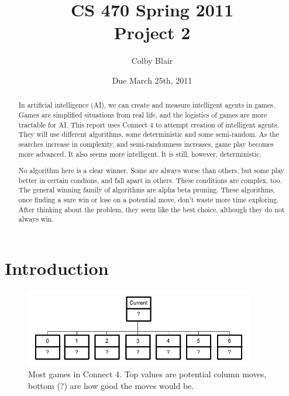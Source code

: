 \documentclass[12pt]{article}
\title{CS 470 Spring 2011 \\
     Project 2}
\author{Colby Blair}
\date{Due March 25th, 2011}
\begin{document}
\maketitle

\begin{abstract}
In artificial intelligence (AI), we can create and measure intelligent agents in
games. Games are simplified situations from real life, and the logistics of 
games are more tractable for AI. This report uses Connect 4 to attempt creation
of intelligent agents. They will use different algorithms, some deterministic 
and some semi-random. As the searches increase in complexity, and 
semi-randomness increases, game play becomes more advanced. It also seems
more intelligent. It is still, however, deterministic.

No algorithm here is a clear winner. Some are always worse than others, but some play better in certain 
condions, and fall apart in others. These conditions are complex, too. The general winning family of 
algorithms are alpha beta pruning. These algorithms, once finding a sure win or lose on a potential move,
don't waste more time exploring. After thinking about the problem, they seem like the best choice, although
they do not always win.
\end{abstract}

\pagebreak

\tableofcontents
\listoffigures

\pagebreak


\section{Introduction}

\begin{figure}[h]
        \begin{center}
		\includegraphics[width=100mm]{report_images/mm_init.png}
                	\caption{Most games in Connect 4. Top values are potential column moves, 
				bottom (?) are how good the moves would be. }
                	\label{mm_init}
        \end{center}
\end{figure}
\end{document}
